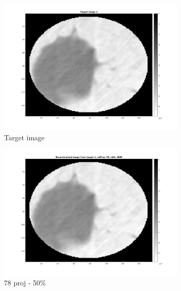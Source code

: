 \documentclass[10pt,a4paper,titlepage]{article}
\begin{document}
\begin{figure}[H]
        	
        	\begin{subfigure}[b]{0.32\textwidth}   
        	    \centering 
            	\includegraphics[width=\textwidth]{Sample1/target1.png}
            	\caption{Target image}  
        	\end{subfigure}
        	\begin{subfigure}[b]{0.32\textwidth}   
        	    \centering 
        	    \includegraphics[width=\textwidth]{Sample1/L-D_5000/78_1_2.png}
        	    \caption{78 proj - 50\%}  
        	    \label{subfig:78p1L-D}
       		\end{subfigure}
        	\begin{subfigure}[b]{0.32\textwidth}  
            	\centering 

\end{subfigure}
\end{figure}
\end{document}
